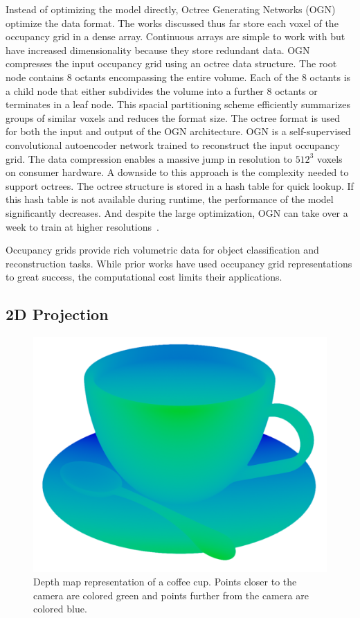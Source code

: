 Instead of optimizing the model directly, Octree Generating Networks (OGN)~\cite{Tatarchenko2017} optimize the data format. The works discussed thus far store each voxel of the occupancy grid in a dense array. Continuous arrays are simple to work with but have increased dimensionality because they store redundant data. OGN compresses the input occupancy grid using an octree data structure. The root node contains 8 octants encompassing the entire volume. Each of the 8 octants is a child node that either subdivides the volume into a further 8 octants or terminates in a leaf node. This spacial partitioning scheme efficiently summarizes groups of similar voxels and reduces the format size. The octree format is used for both the input and output of the OGN architecture. OGN is a self-supervised convolutional autoencoder network trained to reconstruct the input occupancy grid. The data compression enables a massive jump in resolution to $512^3$ voxels on consumer hardware. A downside to this approach is the complexity needed to support octrees. The octree structure is stored in a hash table for quick lookup. If this hash table is not available during runtime, the performance of the model significantly decreases. And despite the large optimization, OGN can take over a week to train at higher resolutions~\cite{Tatarchenko2017}.

Occupancy grids provide rich volumetric data for object classification and reconstruction tasks. While prior works have used occupancy grid representations to great success, the computational cost limits their applications.

\newpage


\subsection{2D Projection}

\begin{figure}[ht]
	\centering
	\includegraphics[scale=0.2]{Images/Depth Map Cup}
	\caption{Depth map representation of a coffee cup. Points closer to the camera are colored green and points further from the camera are colored blue.}
	\label{fig:depth_map_cup}
\end{figure}

